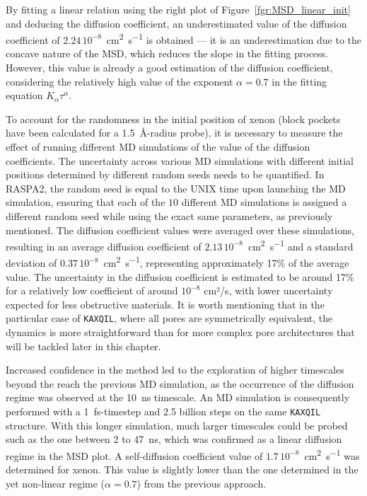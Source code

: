 \documentclass[main]{subfiles}
\begin{document}
By fitting a linear relation using the right plot of Figure~\ref{fgr:MSD_linear_init} and deducing the diffusion coefficient, an underestimated value of the diffusion coefficient of $2.24\,10^{-8}$~\si{\square\cm\per\s} is obtained --- it is an underestimation due to the concave nature of the MSD, which reduces the slope in the fitting process. However, this value is already a good estimation of the diffusion coefficient, considering the relatively high value of the exponent $\alpha=0.7$ in the fitting equation $K_\alpha\tau^\alpha$.

To account for the randomness in the initial position of xenon (block pockets have been calculated for a \SI{1.5}{\angstrom}-radius probe), it is necessary to measure the effect of running different MD simulations of the value of the diffusion coefficients. The uncertainty across various MD simulations with different initial positions determined by different random seeds needs to be quantified. In RASPA2, the random seed is equal to the UNIX time upon launching the MD simulation, ensuring that each of the $10$ different MD simulations is assigned a different random seed while using the exact same parameters, as previously mentioned. The diffusion coefficient values were averaged over these simulations, resulting in an average diffusion coefficient of $2.13\,10^{-8}$~\si{\square\cm\per\s} and a standard deviation of $0.37\,10^{-8}$~\si{\square\cm\per\s}, representing approximately {17\%} of the average value. The uncertainty in the diffusion coefficient is estimated to be around {17\%} for a relatively low coefficient of around $10^{-8}$ cm²/s, with lower uncertainty expected for less obstructive materials. It is worth mentioning that in the particular case of \texttt{KAXQIL}, where all pores are symmetrically equivalent, the dynamics is more straightforward than for more complex pore architectures that will be tackled later in this chapter.

Increased confidence in the method led to the exploration of higher timescales beyond the reach the previous MD simulation, as the occurrence of the diffusion regime was observed at the \SI{10}{\ns} timescale. An MD simulation is consequently performed with a 1~\si{\fs}-timestep and 2.5 billion steps on the same \texttt{KAXQIL} structure. With this longer simulation, much larger timescales could be probed such as the one between {2} to {47}~\si{\ns}, which was confirmed as a linear diffusion regime in the MSD plot. A self-diffusion coefficient value of $1.7\,10^{-8}$~\si{\square\cm\per\s} was determined for xenon. This value is slightly lower than the one determined in the yet non-linear regime ($\alpha=0.7$) from the previous approach.
\end{document}
